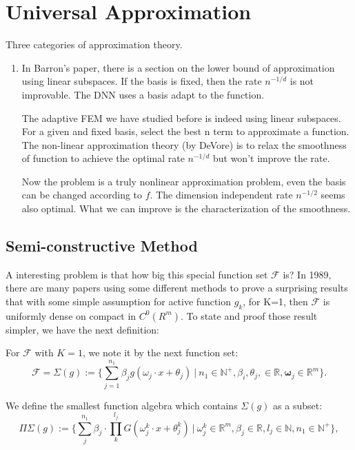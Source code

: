 \chapter{Universal Approximation}\label{ch:approx}

Three categories of approximation theory.
\begin{enumerate}
\item 
In Barron's paper, there is a section on the lower bound of
approximation using linear subspaces. If the basis is fixed, then the
rate $n^{-1/d}$ is not improvable. The DNN uses a basis adapt to the
function.

The adaptive FEM we have studied before is indeed using linear
subspaces. For a given and fixed basis, select the best n term to
approximate a function. The non-linear approximation theory (by
DeVore) is to relax the smoothness of function to achieve the optimal
rate $n^{-1/d}$ but won't improve the rate.

Now the problem is a truly nonlinear approximation problem, even the
basis can be changed according to $f$. The dimension independent rate
$n^{-1/2}$ seems also optimal. What we can improve is the
characterization of the smoothness.
\end{enumerate}



\section{Semi-constructive Method}
A interesting problem is that how big this special function set $\mathcal{F}$ is? In 1989, there are many papers using some different methods to prove a surprising results that with some simple assumption for active function $g_k$, for K=1, then $\mathcal{F}$ is uniformly dense on compact in $C^0(R^{m})$. To state and proof those result simpler, we have the next definition:
\begin{definition}\label{def:space}
For $\mathcal{F}$ with $K=1$, we note it by the next function set:
\begin{equation}
\mathcal{F} = \Sigma(g) := \{ \sum_{j=1}^{n_1} \beta_j g (\omega_{j}\cdot x + \theta_{j}) ~ | ~  n_1 \in \mathbb{N}^{+}, \beta_i, \theta_j, \in \mathbb{R}, \bm \omega_j \in \mathbb{R}^m \}.
\end{equation}
\end{definition}

\begin{definition}\label{def:algebra-space}
We define the smallest function algebra which contains $\Sigma(g)$ as a subset:
\begin{equation}
\Pi \Sigma(g) := \{ \sum_{j}^{n_1} \beta_j \cdot \prod_{k}^{l_j}G({\omega}_{j}^k \cdot {x} + \theta_j^k) ~|~ {\omega}_{j}^{k} \in \mathbb{R}^m, \beta_j \in \mathbb{R}, l_j \in \mathbb{N}, n_1 \in \mathbb{N}^{+} \},
\end{equation}
\end{definition}

